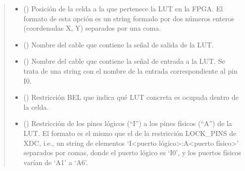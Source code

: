 \documentclass[letterpaper,10pt,english]{sphinxmanual}
\begin{document}
\begin{fulllineitems}
\begin{quote}
\begin{description}
\begin{itemize}
\item {} 
\sphinxAtStartPar
{} () \textendash{} Posición de la celda a la que pertenece la LUT en la FPGA. El formato de esta opción es un string formado por dos números enteros (coordenadas X, Y) separados por una coma.

\item {} 
\sphinxAtStartPar
{} () \textendash{} Nombre del cable que contiene la señal de salida de la LUT.

\item {} 
\sphinxAtStartPar
{} () \textendash{} Nombre del cable que contiene la señal de entrada a la LUT. Se trata de una string con el nombre de la entrada correspondiente al pin I0.

\item {} 
\sphinxAtStartPar
{} (\sphinxstyleliteralemphasis{\sphinxupquote{, }}\sphinxstyleliteralemphasis{\sphinxupquote{, }}\sphinxstyleliteralemphasis{\sphinxupquote{, }}) \textendash{} Restricción BEL que indica qué LUT concreta es ocupada dentro de la celda.

\item {} 
\sphinxAtStartPar
{} () \textendash{} Restricción de los pines lógicos (“I”) a los pines físicos (“A”) de la LUT. El formato es el mismo que el de la restricción LOCK\_PINS de XDC, i.e., un string de elementos ‘I\textless{}puerto lógico\textgreater{}:A\textless{}puerto físico\textgreater{}’ separados por comas, donde el puerto lógico es ‘I0’, y los puertos físicos varían de ‘A1’ a ‘A6’.

\end{itemize}

\end{description}\end{quote}


\end{fulllineitems}
\end{document}
